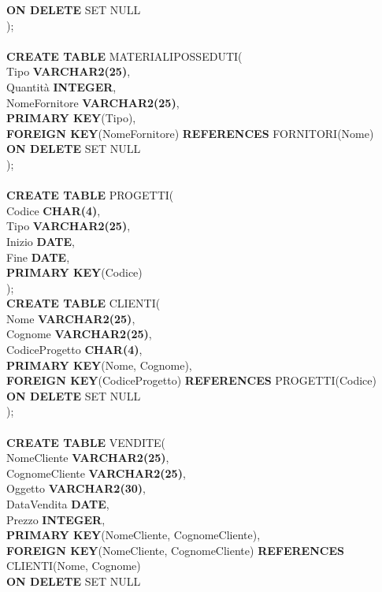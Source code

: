 \documentclass[a4paper,12pt,italian]{article}
\begin{document}
\textbf{ON DELETE} SET NULL \\
); \\ \\
\textbf{CREATE TABLE} MATERIALIPOSSEDUTI( \\
Tipo \textbf{VARCHAR2(25)}, \\
Quantità \textbf{INTEGER}, \\
NomeFornitore \textbf{VARCHAR2(25)}, \\
\textbf{PRIMARY KEY}(Tipo), \\
\textbf{FOREIGN KEY}(NomeFornitore) \textbf{REFERENCES} FORNITORI(Nome) \\
\textbf{ON DELETE} SET NULL \\
); \\ \\
\textbf{CREATE TABLE} PROGETTI( \\
Codice \textbf{CHAR(4)}, \\
Tipo \textbf{VARCHAR2(25)}, \\
Inizio \textbf{DATE}, \\
Fine \textbf{DATE}, \\
\textbf{PRIMARY KEY}(Codice) \\
); \\
\textbf{CREATE TABLE} CLIENTI( \\
Nome \textbf{VARCHAR2(25)}, \\
Cognome \textbf{VARCHAR2(25)}, \\
CodiceProgetto \textbf{CHAR(4)}, \\
\textbf{PRIMARY KEY}(Nome, Cognome), \\
\textbf{FOREIGN KEY}(CodiceProgetto) \textbf{REFERENCES} PROGETTI(Codice) \\
\textbf{ON DELETE} SET NULL \\
); \\ \\
\textbf{CREATE TABLE} VENDITE( \\ 
NomeCliente \textbf{VARCHAR2(25)}, \\
CognomeCliente \textbf{VARCHAR2(25)}, \\
Oggetto \textbf{VARCHAR2(30)}, \\
DataVendita \textbf{DATE}, \\
Prezzo \textbf{INTEGER}, \\
\textbf{PRIMARY KEY}(NomeCliente, CognomeCliente), \\
\textbf{FOREIGN KEY}(NomeCliente, CognomeCliente) \textbf{REFERENCES} CLIENTI(Nome, Cognome) \\ \textbf{ON DELETE} SET NULL \\
\end{document}

